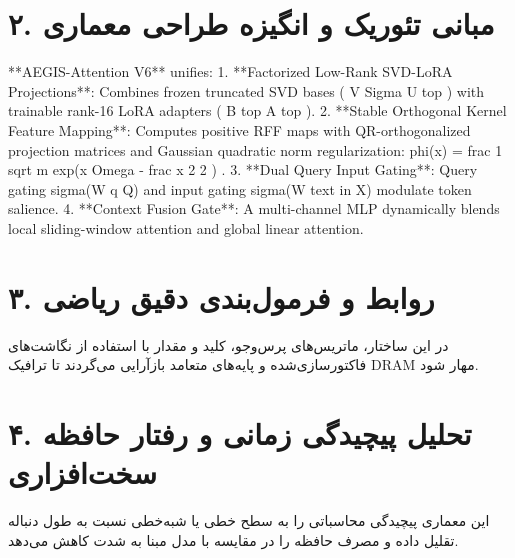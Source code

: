 \documentclass[12pt,a4paper]{article}
\begin{document}
\section*{۲. مبانی تئوریک و انگیزه طراحی معماری}
**AEGIS-Attention V6** unifies: 1. **Factorized Low-Rank SVD-LoRA Projections**: Combines frozen truncated SVD bases ( V Sigma U top ) with trainable rank-16 LoRA adapters ( B top A top ). 2. **Stable Orthogonal Kernel Feature Mapping**: Computes positive RFF maps with QR-orthogonalized projection matrices and Gaussian quadratic norm regularization: phi(x) = frac 1 sqrt m exp(x Omega - frac x 2 2 ) . 3. **Dual Query Input Gating**: Query gating sigma(W q Q) and input gating sigma(W text in X) modulate token salience. 4. **Context Fusion Gate**: A multi-channel MLP dynamically blends local sliding-window attention and global linear attention.

\section*{۳. روابط و فرمول‌بندی دقیق ریاضی}
در این ساختار، ماتریس‌های پرس‌وجو، کلید و مقدار با استفاده از نگاشت‌های فاکتورسازی‌شده و پایه‌های متعامد بازآرایی می‌گردند تا ترافیک DRAM مهار شود.

\section*{۴. تحلیل پیچیدگی زمانی و رفتار حافظه سخت‌افزاری}
این معماری پیچیدگی محاسباتی را به سطح خطی یا شبه‌خطی نسبت به طول دنباله تقلیل داده و مصرف حافظه را در مقایسه با مدل مبنا به شدت کاهش می‌دهد.
\end{document}
